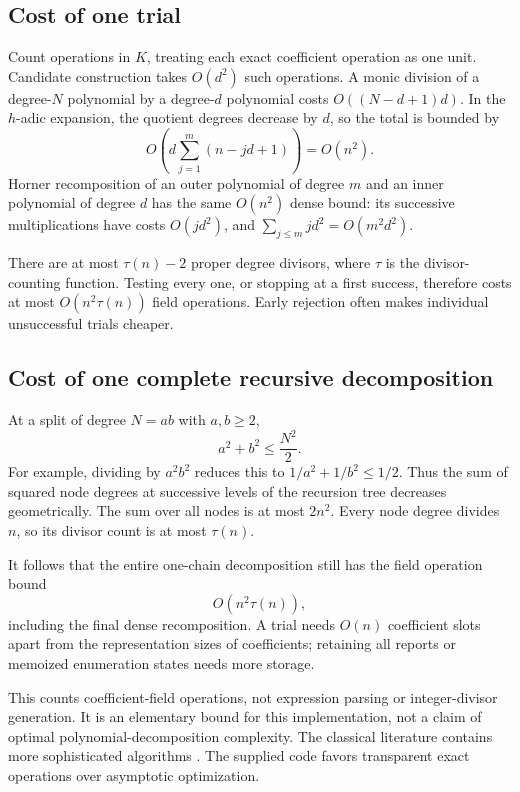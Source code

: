 \documentclass[11pt,letterpaper]{article}
\theoremstyle{definition}
\theoremstyle{remark}
\begin{document}
\subsection{Cost of one trial}
Count operations in $K$, treating each exact coefficient operation as
one unit. Candidate construction takes $O(d^2)$ such operations.
A monic division of a degree-$N$ polynomial by a degree-$d$ polynomial
costs $O((N-d+1)d)$. In the $h$-adic expansion, the quotient degrees
decrease by $d$, so the total is bounded by
\[
 O\left(d\sum_{j=1}^{m}(n-jd+1)\right)=O(n^2).
\]
Horner recomposition of an outer polynomial of degree $m$ and an inner
polynomial of degree $d$ has the same $O(n^2)$ dense bound: its successive
multiplications have costs $O(jd^2)$, and
$\sum_{j\leq m}jd^2=O(m^2d^2)$.

There are at most $\tau(n)-2$ proper degree divisors, where $\tau$ is
the divisor-counting function. Testing every one, or stopping at a first
success, therefore costs at most $O(n^2\tau(n))$ field operations.
Early rejection often makes individual unsuccessful trials cheaper.

\subsection{Cost of one complete recursive decomposition}
At a split of degree $N=ab$ with $a,b\geq2$,
\[
 a^2+b^2\leq\frac{N^2}{2}.
\]
For example, dividing by $a^2b^2$ reduces this to
$1/a^2+1/b^2\leq1/2$. Thus the sum of squared node degrees at successive
levels of the recursion tree decreases geometrically. The sum over all
nodes is at most $2n^2$. Every node degree divides $n$, so its divisor
count is at most $\tau(n)$.

It follows that the entire one-chain decomposition still has the field
operation bound
\begin{equation}\label{eq:complexity}
 O(n^2\tau(n)),
\end{equation}
including the final dense recomposition. A trial needs $O(n)$ coefficient
slots apart from the representation sizes of coefficients; retaining all
reports or memoized enumeration states needs more storage.

This counts coefficient-field operations, not expression parsing or
integer-divisor generation. It is an elementary bound for this
implementation, not a claim of optimal polynomial-decomposition complexity. The classical literature
contains more sophisticated algorithms \cite{kozen-landau}. The supplied
code favors transparent exact operations over asymptotic optimization.
\end{document}
